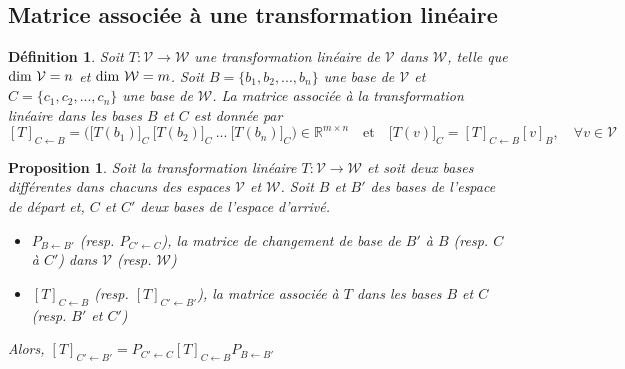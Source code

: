 \documentclass{article}[french, babel]
\newtheorem{mydef}{Définition}
\newtheorem{myprop}{Proposition}
\begin{document}
	\subsection{Matrice associée à une transformation linéaire}
		\begin{mydef}
			Soit $T : \mathcal{V}\longrightarrow\mathcal{W}$ une transformation linéaire de $\mathcal{V}$ dans $\mathcal{W}$, telle que $\text{\normalfont{dim}}\ \mathcal{V}=n$ et $\text{\normalfont{dim}}\ \mathcal{W}=m$. Soit $B=\{b_1,b_2,...,b_n\}$ une base de $\mathcal{V}$ et $C=\{c_1,c_2,...,c_n\}$ une base de $\mathcal{W}$. La matrice associée à la transformation linéaire dans les bases $B$ et $C$ est donnée par
			\[[T]_{C\leftarrow B}=\Big(\big[T(b_1)\big]_C\: \big[T(b_2)\big]_C\: ...\: \big[T(b_n)\big]_C\Big)\in\mathbb{R}^{m\times n}\quad\text{et}\quad\big[T(v)\big]_C = [T]_{C\leftarrow B}[v]_B,\quad\forall v\in\mathcal{V}\]
		\end{mydef}
		\begin{myprop}
			Soit la transformation linéaire $T : \mathcal{V}\longrightarrow\mathcal{W}$ et soit deux bases différentes dans chacuns des espaces $\mathcal{V}$ et $\mathcal{W}$. Soit $B$ et $B'$ des bases de l'espace de départ et, $C$ et $C'$ deux bases de l'espace d'arrivé.
			\begin{itemize}
				\item $P_{B\leftarrow B'}$ (resp. $P_{C'\leftarrow C}$), la matrice de changement de base de $B'$ à $B$ (resp. $C$ à $C'$) dans $\mathcal{V}$ (resp. $\mathcal{W}$)
				\item $[T]_{C\leftarrow B}$ (resp. $[T]_{C'\leftarrow B'}$), la matrice associée à $T$ dans les bases $B$ et $C$ (resp. $B'$ et $C'$) 
			\end{itemize}
		Alors, $[T]_{C'\leftarrow B'}=P_{C'\leftarrow C}[T]_{C\leftarrow B}P_{B\leftarrow B'}$ 
		\end{myprop}
\end{document}
